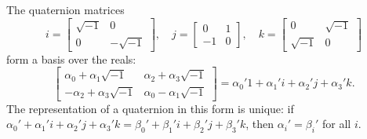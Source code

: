 The quaternion matrices
$$i = \begin{bmatrix} \sqrt{-1} & 0 \\ 0 & -\sqrt{-1} \end{bmatrix}, \quad j = \begin{bmatrix} 0 & 1 \\ -1 & 0 \end{bmatrix}, \quad k = \begin{bmatrix} 0 & \sqrt{-1} \\ \sqrt{-1} & 0 \end{bmatrix}$$
form a basis over the reals:
$$\begin{bmatrix} \alpha_0 + \alpha_1\sqrt{-1} & \alpha_2 + \alpha_3\sqrt{-1} \\ -\alpha_2 + \alpha_3\sqrt{-1} & \alpha_0 - \alpha_1\sqrt{-1} \end{bmatrix} = \alpha_0' 1 + \alpha_1' i + \alpha_2' j + \alpha_3' k.$$
The representation of a quaternion in this form is unique: if $\alpha_0' + \alpha_1'i + \alpha_2'j + \alpha_3'k = \beta_0' + \beta_1'i + \beta_2'j + \beta_3'k$, then $\alpha_i' = \beta_i'$ for all $i$.
